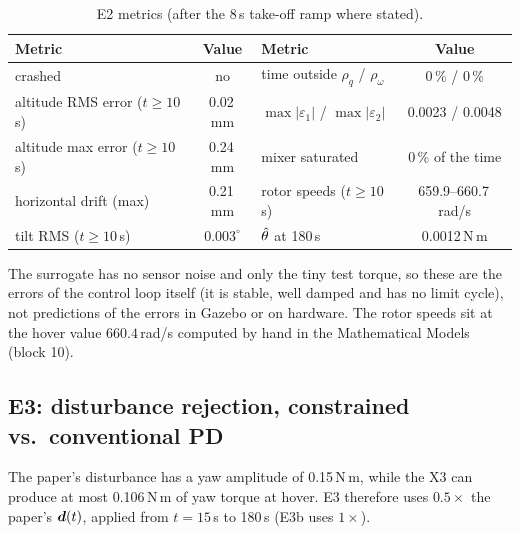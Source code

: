 \begin{table}[H]
\centering\small
\caption{E2 metrics (after the 8\,s take-off ramp where stated).}
\label{tab:e2}
\begin{tabular}{@{}lc@{\hspace{1.5cm}}lc@{}}
\toprule
\textbf{Metric} & \textbf{Value} & \textbf{Metric} & \textbf{Value}\\
\midrule
crashed & no & time outside $\rho_q$ / $\rho_\omega$ & 0\,\% / 0\,\%\\
altitude RMS error ($t\ge10$\,s) & 0.02\,mm & $\max|\varepsilon_1|$ / $\max|\varepsilon_2|$ & 0.0023 / 0.0048\\
altitude max error ($t\ge10$\,s) & 0.24\,mm & mixer saturated & 0\,\% of the time\\
horizontal drift (max) & 0.21\,mm & rotor speeds ($t\ge10$\,s) & 659.9--660.7\,rad/s\\
tilt RMS ($t\ge10$\,s) & $0.003^\circ$ & $\hat{\theta}$ at 180\,s & 0.0012\,N\,m\\
\bottomrule
\end{tabular}
\end{table}

\begin{warn}
The surrogate has no sensor noise and only the tiny test torque, so these are the errors of the control loop itself
(it is stable, well damped and has no limit cycle), not predictions of the errors in Gazebo or on hardware. The rotor
speeds sit at the hover value $660.4$\,rad/s computed by hand in the Mathematical Models (block 10).
\end{warn}

\subsection{E3: disturbance rejection, constrained vs.\ conventional PD}

The paper's disturbance has a yaw amplitude of 0.15\,N\,m, while the X3 can produce at most 0.106\,N\,m of yaw torque at
hover. E3 therefore uses $0.5\times$ the paper's $\bm{d}(t)$, applied from $t=15$\,s to 180\,s (E3b uses $1\times$).


